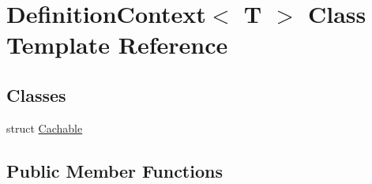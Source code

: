 \hypertarget{class_definition_context}{}\section{Definition\+Context$<$ T $>$ Class Template Reference}
\label{class_definition_context}
\subsection*{Classes}
\begin{DoxyCompactItemize}
\item 
struct \mbox{\hyperlink{struct_definition_context_1_1_cachable}{Cachable}}
\end{DoxyCompactItemize}
\subsection*{Public Member Functions}
